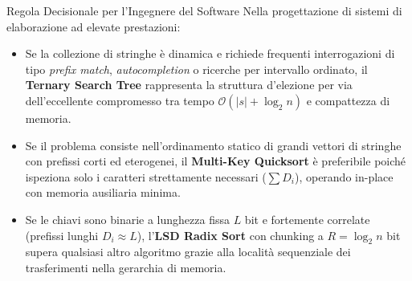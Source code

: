 \begin{noteblock}{Regola Decisionale per l'Ingegnere del Software}
Nella progettazione di sistemi di elaborazione ad elevate prestazioni:
\begin{itemize}
  \item Se la collezione di stringhe \`e dinamica e richiede frequenti interrogazioni di tipo \textit{prefix match}, \textit{autocompletion} o ricerche per intervallo ordinato, il \textbf{Ternary Search Tree} rappresenta la struttura d'elezione per via dell'eccellente compromesso tra tempo $\mathcal{O}(|s| + \log_2 n)$ e compattezza di memoria.
  \item Se il problema consiste nell'ordinamento statico di grandi vettori di stringhe con prefissi corti ed eterogenei, il \textbf{Multi-Key Quicksort} \`e preferibile poich\'e ispeziona solo i caratteri strettamente necessari ($\sum D_i$), operando in-place con memoria ausiliaria minima.
  \item Se le chiavi sono binarie a lunghezza fissa $L$ bit e fortemente correlate (prefissi lunghi $D_i \approx L$), l'\textbf{LSD Radix Sort} con chunking a $R = \log_2 n$ bit supera qualsiasi altro algoritmo grazie alla localit\`a sequenziale dei trasferimenti nella gerarchia di memoria.
\end{itemize}
\end{noteblock}
